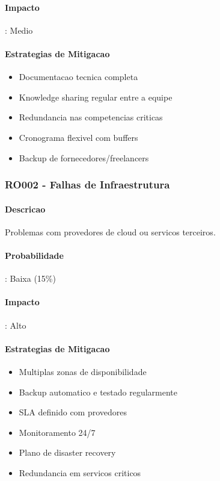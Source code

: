 \paragraph{Impacto}: Medio

\paragraph{Estrategias de Mitigacao}
\begin{itemize}
    \item Documentacao tecnica completa
    \item Knowledge sharing regular entre a equipe
    \item Redundancia nas competencias criticas
    \item Cronograma flexivel com buffers
    \item Backup de fornecedores/freelancers
\end{itemize}

\subsubsection{RO002 - Falhas de Infraestrutura}

\paragraph{Descricao}
Problemas com provedores de cloud ou servicos terceiros.

\paragraph{Probabilidade}: Baixa (15\%)
\paragraph{Impacto}: Alto

\paragraph{Estrategias de Mitigacao}
\begin{itemize}
    \item Multiplas zonas de disponibilidade
    \item Backup automatico e testado regularmente
    \item SLA definido com provedores
    \item Monitoramento 24/7
    \item Plano de disaster recovery
    \item Redundancia em servicos criticos
\end{itemize}

